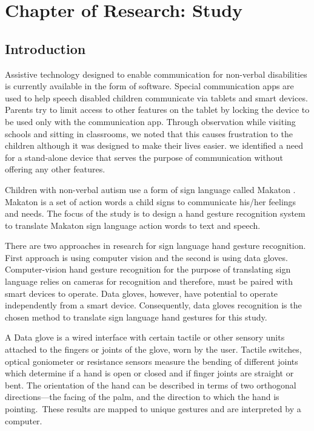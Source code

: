 \chapter{Chapter of Research: Study} 

\section{Introduction}

Assistive technology designed to enable communication for non-verbal disabilities is currently available in the form of software. Special communication apps are used to help speech disabled children communicate via tablets and smart devices. Parents try to limit access to other features on the tablet by locking the device to be used only with the communication app. Through observation while visiting schools and sitting in classrooms, we noted that this causes frustration to the children although it was designed to make their lives easier. we identified a need for a stand-alone device that serves the purpose of communication without offering any other features.

Children with non-verbal autism use a form of sign language called Makaton \parencite{Makaton}. Makaton is a set of action words a child signs to communicate his/her feelings and needs. The focus of the study is to design a hand gesture recognition system to translate Makaton sign language action words to text and speech. 

There are two approaches in research for sign language hand gesture recognition. First approach is using computer vision and the second is using data gloves. Computer-vision hand gesture recognition for the purpose of translating sign language relies on cameras for recognition and therefore, must be paired with smart devices to operate. Data gloves, however, have potential to operate independently from a smart device. Consequently, data gloves recognition is the chosen method to translate sign language hand gestures for this study. 

A Data glove is a wired interface with certain tactile or other sensory units attached to the fingers or joints of the glove, worn by the user. Tactile switches, optical goniometer or resistance sensors measure the bending of different joints which determine if a hand is open or closed and if finger joints are straight or bent. The orientation of the hand can be described in terms of two orthogonal directions—the facing of the palm, and the direction to which the hand is pointing. These results are mapped to unique gestures and are interpreted by a computer. 

